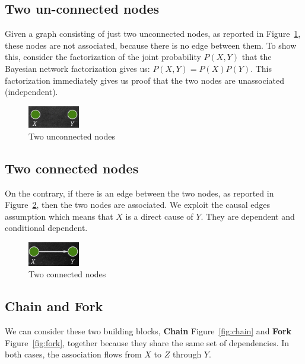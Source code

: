 \subsection{Two un-connected nodes}
Given a graph consisting of just two unconnected nodes, as reported in Figure~\ref{fig:two_unconnected_nodes},
these nodes are not associated, because there is no edge between them. To show
this, consider the factorization of the joint probability $P(X, Y)$ that the
Bayesian network factorization gives us: $P(X, Y) = P(X)P(Y)$. This factorization
immediately gives us proof that the two nodes are unassociated (independent).

\begin{figure}[!ht]
    \centering
    \includegraphics[width=0.2\textwidth]{img/flow/two_unconnected_nodes.png}
    \caption{Two unconnected nodes}
    \label{fig:two_unconnected_nodes}
\end{figure}
\subsection{Two connected nodes}
On the contrary, if there is an edge between the two nodes, as reported in Figure~\ref{fig:two_connected_nodes},
then the two nodes are associated. We exploit the causal edges assumption which
means that $X$ is a direct cause of $Y$. They are dependent and conditional dependent.

\begin{figure}[!ht]
    \centering
    \includegraphics[width=0.2\textwidth]{img/flow/two_connected_nodes.png}
    \caption{Two connected nodes}
    \label{fig:two_connected_nodes}
\end{figure}

\subsection{Chain and Fork}
We can consider these two building blocks, \textbf{Chain} Figure~\ref{fig:chain}
and \textbf{Fork} Figure~\ref{fig:fork}, together because they share the same
set of dependencies. In both cases, the association flows from $X$ to $Z$ through
$Y$.

